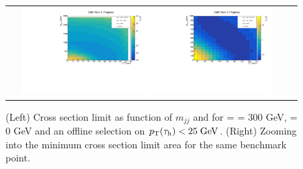 \begin{figure}[tbh!]
	\centering
	\begin{tabular}{cc}
		\includegraphics[width=0.45\textwidth]{analysis/pics/JetInvMass_vs_MET_xsec_chi300_lsp000_taupt25.pdf}
		\includegraphics[width=0.45\textwidth]{analysis/pics/JetInvMass_vs_MET_xsec_chi300_lsp000_taupt25_zoom.pdf} 		
	\end{tabular}
	\caption{(Left) Cross section limit as function of $m_{jj}$ and \met for \charginopm = \neutralinotwo = 300 GeV, \neutralinoone = 0 GeV and an offline selection on $p_{\text{T}}(\tau_{\text{h}}) <  25\;\text{Ge}\kern-0.06667em\text{V}$. (Right) Zooming into the minimum cross section limit area for the same benchmark point.}
	\label{fig::JetInvMass_vs_MET_xsec_chi300_lsp000_taupt25}
\end{figure}

